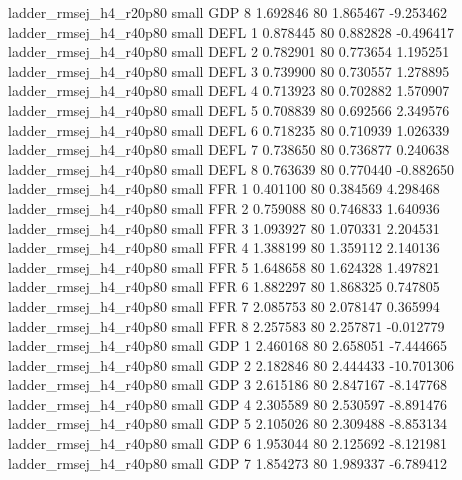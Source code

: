   ladder_rmsej_h4_r20p80      small      GDP                 8 1.692846 80       1.865467          -9.253462
  ladder_rmsej_h4_r40p80      small     DEFL                 1 0.878445 80       0.882828          -0.496417
  ladder_rmsej_h4_r40p80      small     DEFL                 2 0.782901 80       0.773654           1.195251
  ladder_rmsej_h4_r40p80      small     DEFL                 3 0.739900 80       0.730557           1.278895
  ladder_rmsej_h4_r40p80      small     DEFL                 4 0.713923 80       0.702882           1.570907
  ladder_rmsej_h4_r40p80      small     DEFL                 5 0.708839 80       0.692566           2.349576
  ladder_rmsej_h4_r40p80      small     DEFL                 6 0.718235 80       0.710939           1.026339
  ladder_rmsej_h4_r40p80      small     DEFL                 7 0.738650 80       0.736877           0.240638
  ladder_rmsej_h4_r40p80      small     DEFL                 8 0.763639 80       0.770440          -0.882650
  ladder_rmsej_h4_r40p80      small      FFR                 1 0.401100 80       0.384569           4.298468
  ladder_rmsej_h4_r40p80      small      FFR                 2 0.759088 80       0.746833           1.640936
  ladder_rmsej_h4_r40p80      small      FFR                 3 1.093927 80       1.070331           2.204531
  ladder_rmsej_h4_r40p80      small      FFR                 4 1.388199 80       1.359112           2.140136
  ladder_rmsej_h4_r40p80      small      FFR                 5 1.648658 80       1.624328           1.497821
  ladder_rmsej_h4_r40p80      small      FFR                 6 1.882297 80       1.868325           0.747805
  ladder_rmsej_h4_r40p80      small      FFR                 7 2.085753 80       2.078147           0.365994
  ladder_rmsej_h4_r40p80      small      FFR                 8 2.257583 80       2.257871          -0.012779
  ladder_rmsej_h4_r40p80      small      GDP                 1 2.460168 80       2.658051          -7.444665
  ladder_rmsej_h4_r40p80      small      GDP                 2 2.182846 80       2.444433         -10.701306
  ladder_rmsej_h4_r40p80      small      GDP                 3 2.615186 80       2.847167          -8.147768
  ladder_rmsej_h4_r40p80      small      GDP                 4 2.305589 80       2.530597          -8.891476
  ladder_rmsej_h4_r40p80      small      GDP                 5 2.105026 80       2.309488          -8.853134
  ladder_rmsej_h4_r40p80      small      GDP                 6 1.953044 80       2.125692          -8.121981
  ladder_rmsej_h4_r40p80      small      GDP                 7 1.854273 80       1.989337          -6.789412
